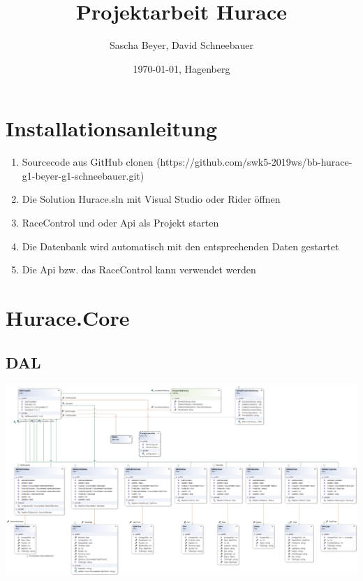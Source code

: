 \documentclass[a4paper, 12pt]{article}
\title{Projektarbeit Hurace}
\author{Sascha Beyer, David Schneebauer}
\date{\today{}, Hagenberg}
\begin{document}
	\maketitle
	\tableofcontents
	\newpage
	\section{Installationsanleitung}
	
	\begin{enumerate}
		\item{Sourcecode aus GitHub clonen (https://github.com/swk5-2019ws/bb-hurace-g1-beyer-g1-schneebauer.git)}
		\item{Die Solution Hurace.sln mit Visual Studio oder Rider öffnen}
		\item{RaceControl und oder Api als Projekt starten}
		\item{Die Datenbank wird automatisch mit den entsprechenden Daten gestartet}
		\item{Die Api bzw. das RaceControl kann verwendet werden}
	\end{enumerate}
	
	

	\section{Hurace.Core}
	\subsection{DAL}
	\includegraphics[width=.9\textwidth]{img/DAL.png}
\end{document}
